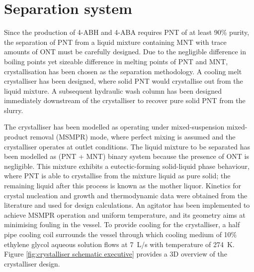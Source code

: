 \section*{Separation system}

Since the production of 4-ABH and 4-ABA requires PNT of at least 90\% purity, the separation of PNT from a liquid mixture containing MNT with trace amounts of ONT must be carefully designed. Due to the negligible difference in boiling points yet sizeable difference in melting points of PNT and MNT, crystallisation has been chosen as the separation methodology. A cooling melt crystalliser has been designed, where solid PNT would crystallise out from the liquid mixture. A subsequent hydraulic wash column has been designed immediately downstream of the crystalliser to recover pure solid PNT from the slurry. 



The crystalliser has been modelled as operating under mixed-suspension mixed-product removal (MSMPR) mode, where perfect mixing is assumed and the crystalliser operates at outlet conditions. The liquid mixture to be separated has been modelled as (PNT + MNT) binary system because the presence of ONT is negligible. This mixture exhibits a eutectic-forming solid-liquid phase behaviour, where PNT is able to crystallise from the mixture liquid as pure solid; the remaining liquid after this process is known as the mother liquor. Kinetics for crystal nucleation and growth and thermodynamic data were obtained from the literature and used for design calculations. An agitator has been implemented to achieve MSMPR operation and uniform temperature, and its geometry aims at minimising fouling in the vessel. To provide cooling for the crystalliser, a half pipe cooling coil surrounds the vessel through which cooling medium of 10\% ethylene glycol aqueous solution flows at \SI{7}{L/s} with temperature of \SI{274}{K}. Figure \ref{fig:crystalliser schematic executive} provides a 3D overview of the crystalliser design.


